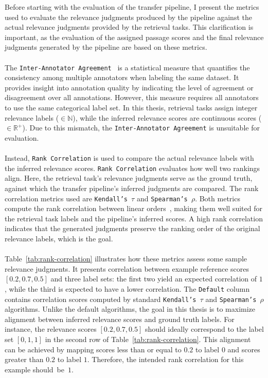 Before starting with the evaluation of the transfer pipeline, I present the metrics used to evaluate the relevance judgments produced by the pipeline against the actual relevance judgments provided by the retrieval tasks. This clarification is important, as the evaluation of the assigned passage scores and the final relevance judgments generated by the pipeline are based on these metrics.
\\\\
The \texttt{Inter-Annotator Agreement}~\cite{artstein:2017} is a statistical measure that quantifies the consistency among multiple annotators when labeling the same dataset. It provides insight into annotation quality by indicating the level of agreement or disagreement over all annotations. However, this measure requires all annotators to use the same categorical label set. In this thesis, retrieval tasks assign integer relevance labels ($\in \mathbb{N}$), while the inferred relevance scores are continuous scores ($\in \mathbb{R}^{+}$). Due to this mismatch, the \mbox{\texttt{Inter-Annotator Agreement}} is unsuitable for evaluation.
\\\\
Instead, \texttt{Rank Correlation} is used to compare the actual relevance labels with the inferred relevance scores. \texttt{Rank Correlation} evaluates how well two rankings align. Here, the retrieval task's relevance judgments serve as the ground truth, against which the transfer pipeline's inferred judgments are compared. The rank correlation metrics used are \texttt{Kendall's $\tau$} and \texttt{Spearman's $\rho$}. Both metrics compute the rank correlation between linear orders~\cite{monjardet:1998}, making them well suited for the retrieval task labels and the pipeline's inferred scores. A high rank correlation indicates that the generated judgments preserve the ranking order of the original relevance labels, which is the goal.
\\\\
Table~\ref{tab:rank-correlation} illustrates how these metrics assess some sample relevance judgments. It presents correlation between example reference scores $[0.2, 0.7, 0.5]$ and three label sets: the first two yield an expected correlation of $1$, while the third is expected to have a lower correlation. The \texttt{Default} column contains correlation scores computed by standard \texttt{Kendall's $\tau$} and \texttt{Spearman's $\rho$} algorithms. Unlike the default algorithms, the goal in this thesis is to maximize alignment between inferred relevance scores and ground truth labels. For instance, the relevance scores $[0.2, 0.7, 0.5]$ should ideally correspond to the label set $[0, 1, 1]$ in the second row of Table~\ref{tab:rank-correlation}. This alignment can be achieved by mapping scores less than or equal to $0.2$ to label $0$ and scores greater than $0.2$ to label $1$. Therefore, the intended rank correlation for this example \mbox{should be $1$.}
